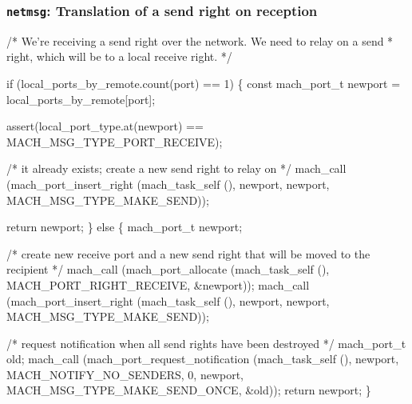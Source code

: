\documentclass{beamer}
\begin{document}
\begin{frame}[fragile]
\frametitle{{\tt netmsg}: Translation of a send right on reception}
\begin{semiverbatim}
\tiny
/* We're receiving a send right over the network.  We need to relay on a send
 * right, which will be to a local receive right.
 */

if (local_ports_by_remote.count(port) == 1)
  \{
    const mach_port_t newport = local_ports_by_remote[port];

    assert(local_port_type.at(newport) == MACH_MSG_TYPE_PORT_RECEIVE);

    /* it already exists; create a new send right to relay on */
    mach_call (mach_port_insert_right (mach_task_self (), newport, newport,
                                       MACH_MSG_TYPE_MAKE_SEND));

    return newport;
  \}
else
  \{
    mach_port_t newport;

    /* create new receive port and a new send right that will be moved to the recipient */
    mach_call (mach_port_allocate (mach_task_self (), MACH_PORT_RIGHT_RECEIVE, &newport));
    mach_call (mach_port_insert_right (mach_task_self (), newport, newport,
                                       MACH_MSG_TYPE_MAKE_SEND));

    /* request notification when all send rights have been destroyed */
    mach_port_t old;
    mach_call (mach_port_request_notification (mach_task_self (), newport,
                                               MACH_NOTIFY_NO_SENDERS, 0,
                                               newport, MACH_MSG_TYPE_MAKE_SEND_ONCE, &old));
    return newport;
  \}
\end{semiverbatim}
\end{frame}
\end{document}
